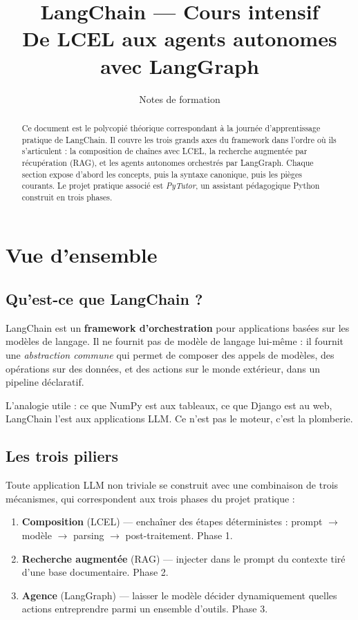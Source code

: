 \documentclass[11pt,a4paper]{article}
\title{\textbf{LangChain --- Cours intensif}\\[4pt]
       \large De LCEL aux agents autonomes avec LangGraph}
\author{Notes de formation}
\date{}
\begin{document}
\maketitle

\begin{abstract}
\noindent Ce document est le polycopié théorique correspondant à la journée d'apprentissage pratique de LangChain. Il couvre les trois grands axes du framework dans l'ordre où ils s'articulent : la composition de chaînes avec LCEL, la recherche augmentée par récupération (RAG), et les agents autonomes orchestrés par LangGraph. Chaque section expose d'abord les concepts, puis la syntaxe canonique, puis les pièges courants. Le projet pratique associé est \textit{PyTutor}, un assistant pédagogique Python construit en trois phases.
\end{abstract}

\tableofcontents
\newpage

\section{Vue d'ensemble}

\subsection{Qu'est-ce que LangChain ?}

LangChain est un \textbf{framework d'orchestration} pour applications basées sur les modèles de langage. Il ne fournit pas de modèle de langage lui-même : il fournit une \emph{abstraction commune} qui permet de composer des appels de modèles, des opérations sur des données, et des actions sur le monde extérieur, dans un pipeline déclaratif.

L'analogie utile : ce que NumPy est aux tableaux, ce que Django est au web, LangChain l'est aux applications LLM. Ce n'est pas le moteur, c'est la plomberie.

\subsection{Les trois piliers}

Toute application LLM non triviale se construit avec une combinaison de trois mécanismes, qui correspondent aux trois phases du projet pratique :

\begin{enumerate}
  \item \textbf{Composition} (LCEL) --- enchaîner des étapes déterministes : prompt $\rightarrow$ modèle $\rightarrow$ parsing $\rightarrow$ post-traitement. Phase 1.
  \item \textbf{Recherche augmentée} (RAG) --- injecter dans le prompt du contexte tiré d'une base documentaire. Phase 2.
  \item \textbf{Agence} (LangGraph) --- laisser le modèle décider dynamiquement quelles actions entreprendre parmi un ensemble d'outils. Phase 3.
\end{enumerate}
\end{document}
